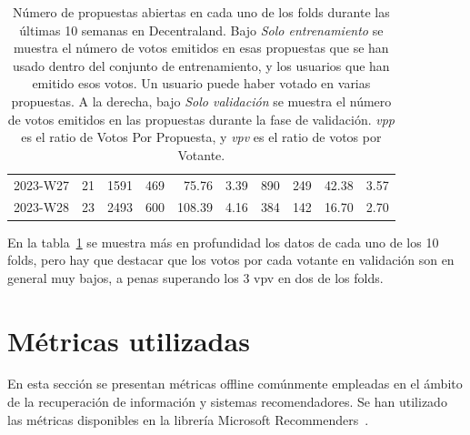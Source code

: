 \begin{table}
\begin{tabular}{l|r|rrrr|rrrr}
2023-W27 & 21 & 1591 & 469 & 75.76 & 3.39 & 890 & 249 & 42.38 & 3.57 \\
2023-W28 & 23 & 2493 & 600 & 108.39 & 4.16 & 384 & 142 & 16.70 & 2.70 \\
    \bottomrule
    \end{tabular}
    \caption{Número de propuestas abiertas en cada uno de los folds durante las últimas 10 semanas en Decentraland. Bajo \textit{Solo entrenamiento} se muestra el número de votos emitidos en esas propuestas que se han usado dentro del conjunto de entrenamiento, y los usuarios que han emitido esos votos. Un usuario puede haber votado en varias propuestas. A la derecha, bajo \textit{Solo validación} se muestra el número de votos emitidos en las propuestas durante la fase de validación. \textit{vpp} es el ratio de Votos Por Propuesta, y \textit{vpv} es el ratio de votos por Votante.}
    \label{tab:open_proposals}
\end{table}

En la tabla~\ref{tab:open_proposals} se muestra más en profundidad los datos de cada uno de los 10 folds, pero hay que destacar que los votos por cada votante en validación son en general muy bajos, a penas superando los 3 \gls{vpv} en dos de los folds.


\section{Métricas utilizadas}
\label{subsec:metricas}

En esta sección se presentan métricas offline comúnmente empleadas en el ámbito de la recuperación de información y sistemas recomendadores. Se han utilizado las métricas disponibles en la librería Microsoft Recommenders~\cite{argyriou_microsoft_2020}.

